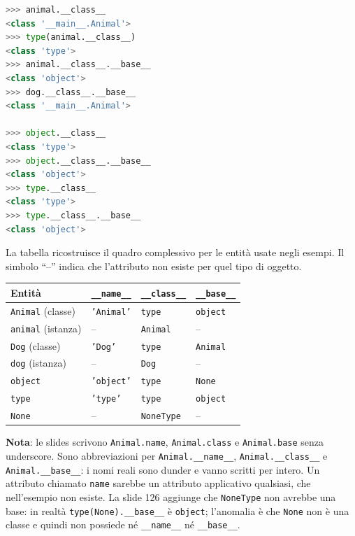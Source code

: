 \documentclass[12pt]{extarticle}
\begin{document}
\begin{lstlisting}[language=Python]
>>> animal.__class__
<class '__main__.Animal'>
>>> type(animal.__class__)
<class 'type'>
>>> animal.__class__.__base__
<class 'object'>
>>> dog.__class__.__base__
<class '__main__.Animal'>

>>> object.__class__
<class 'type'>
>>> object.__class__.__base__
<class 'object'>
>>> type.__class__
<class 'type'>
>>> type.__class__.__base__
<class 'object'>
\end{lstlisting}

\noindent La tabella ricostruisce il quadro complessivo per le entità usate negli esempi. Il simbolo ``--'' indica che l'attributo non esiste per quel tipo di oggetto.

\begin{center}
\small
\begin{tabular}{p{3.0cm}p{3.0cm}p{3.6cm}p{3.4cm}}
    \toprule
    \textbf{Entità} & \texttt{\_\_name\_\_} & \texttt{\_\_class\_\_} & \texttt{\_\_base\_\_} \\
    \midrule
    \texttt{Animal} (classe) & \texttt{'Animal'} & \texttt{type} & \texttt{object} \\
    \addlinespace
    \texttt{animal} (istanza) & -- & \texttt{Animal} & -- \\
    \addlinespace
    \texttt{Dog} (classe) & \texttt{'Dog'} & \texttt{type} & \texttt{Animal} \\
    \addlinespace
    \texttt{dog} (istanza) & -- & \texttt{Dog} & -- \\
    \addlinespace
    \texttt{object} & \texttt{'object'} & \texttt{type} & \texttt{None} \\
    \addlinespace
    \texttt{type} & \texttt{'type'} & \texttt{type} & \texttt{object} \\
    \addlinespace
    \texttt{None} & -- & \texttt{NoneType} & -- \\
    \bottomrule
\end{tabular}
\end{center}

\noindent \textbf{Nota}: le slides scrivono \texttt{Animal.name}, \texttt{Animal.class} e \texttt{Animal.base} senza underscore. Sono abbreviazioni per \texttt{Animal.\_\_name\_\_}, \texttt{Animal.\_\_class\_\_} e \texttt{Animal.\_\_base\_\_}: i nomi reali sono dunder e vanno scritti per intero. Un attributo chiamato \texttt{name} sarebbe un attributo applicativo qualsiasi, che nell'esempio non esiste. La slide 126 aggiunge che \texttt{NoneType} non avrebbe una base: in realtà \texttt{type(None).\_\_base\_\_} è \texttt{object}; l'anomalia è che \texttt{None} non è una classe e quindi non possiede né \texttt{\_\_name\_\_} né \texttt{\_\_base\_\_}.
\end{document}
